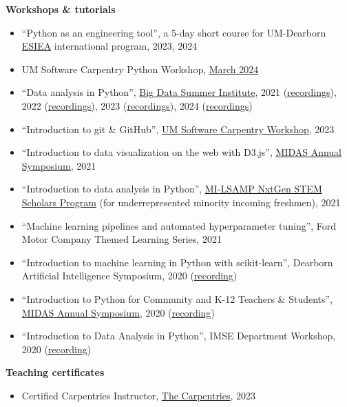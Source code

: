\documentclass[11pt]{article}
\newenvironment{main}
{\begin{adjustwidth}{3em}{}}
{\end{adjustwidth}}
\begin{document}
\begin{main}
\textbf{Workshops \& tutorials}

\begin{itemize}
    \item ``Python as an engineering tool'', a 5-day short course for UM-Dearborn \href{https://www.esiea.fr/en/}{ESIEA} international program, 2023, 2024
    \item UM Software Carpentry Python Workshop, \href{https://umcarpentries.org/2024-03-21-UMich-python/}{March 2024}
    \item ``Data analysis in Python'', \href{https://sph.umich.edu/bdsi/}{Big Data Summer Institute}, 
            2021 (\href{http://bigdatasummerinst.sph.umich.edu/wiki/index.php/Main_Page#Week_2}{recordings}), 
            2022 (\href{http://bigdatasummerinst.sph.umich.edu/wiki2022/index.php/Main_Page#Week_2}{recordings}),
            2023 (\href{https://umich.instructure.com/courses/640918/pages/week-2}{recordings}),
            2024 (\href{https://sph.hosted.panopto.com/Panopto/Pages/Viewer.aspx?id=e03bf1af-3b2f-4bd5-aa27-b19a011c16d3}{recordings})
    \item ``Introduction to git \& GitHub'', \href{https://umcarpentries.org/2023-03-28-UMich/}{UM Software Carpentry Workshop}, 2023
    \item ``Introduction to data visualization on the web with D3.js'', \href{https://midas.umich.edu/2021-symposium/}{MIDAS Annual Symposium}, 2021
    \item ``Introduction to data analysis in Python'', \href{https://www.milsamp.org/programs/nxtgen-stem-scholars/}{MI-LSAMP NxtGen STEM Scholars Program} (for underrepresented minority incoming freshmen), 2021
    \item ``Machine learning pipelines and automated hyperparameter tuning'', Ford Motor Company Themed Learning Series, 2021
    \item ``Introduction to machine learning in Python with scikit-learn'', Dearborn Artificial Intelligence Symposium, 2020 (\href{https://www.youtube.com/watch?v=TD4wCHNhZcU}{recording})
    \item ``Introduction to Python for Community and K-12 Teachers \& Students'', \href{https://midas.umich.edu/2020-symposium/}{MIDAS Annual Symposium}, 2020 (\href{https://youtu.be/r_sfBJIDMtM}{recording})
    \item ``Introduction to Data Analysis in Python'', IMSE Department Workshop, 2020 (\href{https://youtu.be/7IsFmtvBOyc}{recording})
\end{itemize}

\textbf{Teaching certificates}

\begin{itemize}
    \item Certified Carpentries Instructor, \href{https://carpentries.org/}{The Carpentries}, 2023
\end{itemize}


\end{main}
\end{document}
